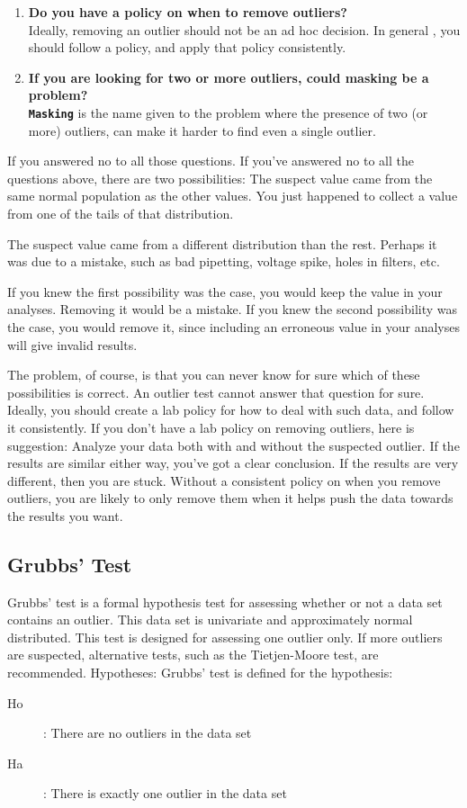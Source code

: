 \begin{enumerate}
\item 	 \textbf{Do you have a policy on when to remove outliers?}\\
Ideally, removing an outlier should not be an ad hoc decision. In general , you should follow a policy, and apply that policy consistently.

\item \textbf{If you are looking for two or more outliers, could masking be a problem?}\\
\textbf{\texttt{Masking}} is the name given to the problem where the presence of two (or more) outliers, can make it harder to find even a single outlier.

\end{enumerate}

If you answered no to all those questions.
If you've answered no to all the questions above, there are two possibilities:
The suspect value came from the same normal population as the other values. You just happened to collect a value from one of the tails of that distribution.
	
The suspect value came from a different distribution than the rest. Perhaps it was due to a mistake, such as bad pipetting, voltage spike, holes in filters, etc. 

If you knew the first possibility was the case, you would keep the value in your analyses. Removing it would be a mistake.
If you knew the second possibility was the case, you would remove it, since including an erroneous value in your analyses will give invalid results. 

The problem, of course, is that you can never know for sure which of these possibilities is correct. An outlier test cannot answer that question for sure. Ideally, you should create a lab policy for how to deal with such data, and follow it consistently.
If you don't have a lab policy on removing outliers, here is suggestion: Analyze your data both with and without the suspected outlier. If the results are similar either way, you've got a clear conclusion. If the results are very different, then you are stuck. Without a consistent policy on when you remove outliers, you are likely to only remove them when it helps push the data towards the results you want.


\subsection{Grubbs’ Test}
Grubbs' test is a formal hypothesis test for assessing whether or not a  data set contains an outlier.
This data set is univariate and approximately normal distributed. This test is designed for assessing one outlier only.  If more outliers are suspected, alternative tests, such as the Tietjen-Moore test, are recommended.
Hypotheses: Grubbs' test is defined for the hypothesis: 
\begin{description}
\item[Ho] :  There are no outliers in the data set  
\item[Ha] :  There is exactly one outlier in the data set  
\end{description}

